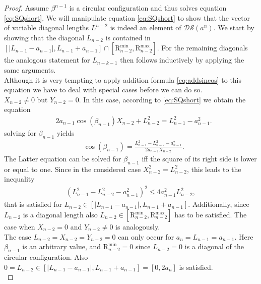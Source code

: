 \documentclass[10pt,a4paper]{article}
\theoremstyle{definition}
\theoremstyle{remark}
\numberwithin{equation}{section}
\begin{document}
\begin{proof} Assume $\beta^{n-1}$ is a circular configuration and thus solves equation \eqref{eq:SQshort}. We will manipulate equation \eqref{eq:SQshort} to show that the vector of variable diagonal lengths $L^{n-2}$ is indeed an element of $\mathcal{DS}({a^n})$. We start by showing  that the diagonal $L_{n-2}$ is contained  in $[|L_{n-1}-a_{n-1}|, L_{n-1}+a_{n-1}] \cap [ \mathrm{    R}_{n-2}^{\min} , \mathrm{    R}_{n-2}^{\max}]$. For the remaining diagonals the analogous statement for $L_{n-k-1}$ then follows inductively by applying the same arguments.\\

Although it is very tempting to apply addition formula \eqref{eq:addsincos} to this equation we have to  deal with special cases before we can do so.\\

$X_{n-2} \neq 0$ but $Y_{n-2} = 0$. In this case, according to \eqref{eq:SQshort} we obtain the equation  \begin{align*}
& 2 a_{n-1} \cos(\beta_{n-1} )  X_{n-2} + L_{n-2}^2  =  L_{n-1}^2 - a_{n-1}^2.  
\end{align*}
solving for $\beta_{n-1}$ yields  
\begin{align*}
& \cos(\beta_{n-1} )     =  \frac{ L_{n-1}^2 - L_{n-2}^2- a_{n-1}^2 }{ 2 a_{n-1}  X_{n-2}  }.  
\end{align*}
The Latter equation can be solved for $\beta_{n-1}$ iff the square of its right side is lower or equal to one. Since in the considered case $ X_{n-2}^2 = L_{n-2}^2$,  this leads to the inequality   
\begin{align}\label{ieq:diagonals}
\left(   L_{n-1}^2 - L_{n-2}^2- a_{n-1}^2 \right)^2 \leq  4 a_{n-1}^2 L_{n-2}^2, 
\end{align}
that is satisfied for $L_{n-2} \in [ |L_{n-1} -a_{n-1}|,  L_{n-1} +a_{n-1} ]$. Additionally, since $L_{n-2}$ is a diagonal length also $L_{n-2} \in [\mathrm{R}_{n-2}^{\min}, \mathrm{    R}_{n-2}^{\max}]$ has to be satisfied. The case when $X_{n-2} = 0$ and $Y_{n-2} \neq 0$ is analogously.\\       

The case $ L_{n-2} = X_{n-2} = Y_{n-2} = 0$ can only  occur for $a_n = L_{n-1} = a_{n-1}$. Here $\beta_{n-1}$ is an arbitrary value, and $\mathrm{R}_{n-2}^{\min} = 0$ since $L_{n-2} = 0 $  is a diagonal of the circular configuration. Also $0 = L_{n-2} \in [ |L_{n-1} -a_{n-1}|,  L_{n-1} +a_{n-1} ] = [0, 2 a _n ]$ is satisfied.\\ 


\end{proof}
\end{document}
